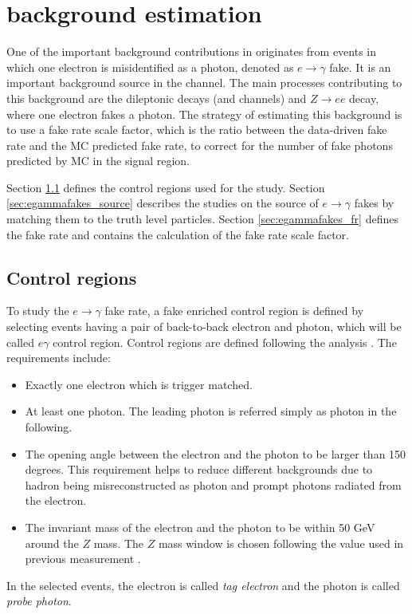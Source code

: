 \section{\efake background estimation}
\label{sec:background-estimation-efake}
One of the important background contributions in \tty originates from events in which one electron is misidentified as a photon, denoted as $e\to\gamma$ fake. It is an important background source in the \ljets channel. The main processes contributing to this background are the \ttbar dileptonic decays (\chee and \chemu channels) and $Z\to ee$ decay, where one electron fakes a photon. The strategy of estimating this background is to use a fake rate scale factor, which is the ratio between the data-driven fake rate and the MC predicted fake rate, to correct for the number of fake photons predicted by MC in the signal region.


Section \ref{sec:egammafakes_cr} defines the control regions used for the study. 
Section \ref{sec:egammafakes_source} describes the studies on the source of $e\to\gamma$ fakes by matching them to the truth level particles. Section \ref{sec:egammafakes_fr} defines the fake rate and contains the calculation of the fake rate scale factor.

\subsection{Control regions}
\label{sec:egammafakes_cr}

To study the $e\to\gamma$ fake rate, a fake enriched control region is defined by selecting events having a pair of back-to-back electron and photon, which will be called $e\gamma$ control region. Control regions are defined following the analysis \cite{Batool:2266485}.
The requirements include:
\begin{itemize}
\item Exactly one electron which is trigger matched.
\item At least one photon. The leading \pt photon is referred simply as photon in the following.
\item The opening angle between the electron and the photon to be larger than 150 degrees. This requirement helps to reduce different backgrounds due to hadron being misreconstructed as photon and prompt photons radiated from the electron.
\item The invariant mass of the electron and the photon to be within 50 GeV around the $Z$ mass. The $Z$ mass window is chosen following the value used in previous measurement \cite{Batool:2266485}.
\end{itemize}
In the selected events, the electron is called \textit{tag electron} and the photon is called \textit{probe photon}.

